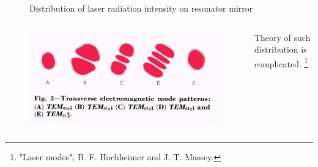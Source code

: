 \documentclass{beamer}
\begin{document}
\begin{frame}
\begin{columns}
\begin{column}{0.4\textwidth}
\begin{figure}
					\caption{\footnotesize Distribution of laser radiation intensity on resonator mirror}
				\end{figure}
			\end{column}
		\end{columns}			
		
		\vspace{-10pt}
		
		\begin{columns}
			\begin{column}{0.5\textwidth}
				\begin{figure}
					\centering
					\includegraphics[width=1\linewidth]{res/tem_patterns.png}
				\end{figure}
			\end{column}
			\begin{column}{0.4\textwidth}
				Theory of such distribution is complicated. \footnote{\;"Laser modes", B. F. Hochheimer and J. T. Massey.}
			\end{column}
		\end{columns}	
		
		\end{frame}
	
\end{document}
